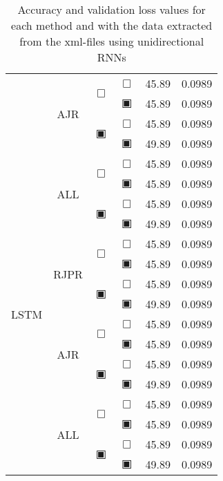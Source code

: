 \begin{table}[H]
\begin{tabular}{|c|c|c|c|c|c|}
				    & \multirow{4}{*}{ AJR } & \multirow{2}{*}{$\Box$} & $\Box$ & 45.89 & 0.0989\\\cline{4-6}
				    &                     &                         & $\blackinwhitesquare$ & 45.89 & 0.0989\\\cline{3-6}
				    &                     & \multirow{2}{*}{$\blackinwhitesquare$} & $\Box$ & 45.89 & 0.0989\\\cline{4-6}
				    &                     &                         & $\blackinwhitesquare$ & 49.89 & 0.0989\\\cline{2-6}
				    & \multirow{4}{*}{ ALL } & \multirow{2}{*}{$\Box$} & $\Box$ & 45.89 & 0.0989\\\cline{4-6}
				    &                     &                         & $\blackinwhitesquare$ & 45.89 & 0.0989\\\cline{3-6}
				    &                     & \multirow{2}{*}{$\blackinwhitesquare$} & $\Box$ & 45.89 & 0.0989\\\cline{4-6}
				    &                     &                         & $\blackinwhitesquare$ & 49.89 & 0.0989\\\cline{2-6}
		\hline\hline
		\multirow{8}{*}{LSTM}& \multirow{4}{*}{ RJPR } & \multirow{2}{*}{$\Box$} & $\Box$ & 45.89 & 0.0989\\\cline{4-6}
				    &                    &                         & $\blackinwhitesquare$ & 45.89 & 0.0989\\\cline{3-6}
				    &                    & \multirow{2}{*}{$\blackinwhitesquare$} & $\Box$ & 45.89 & 0.0989\\\cline{4-6}
				    &                    &                         & $\blackinwhitesquare$ & 49.89 & 0.0989\\\cline{2-6}
				    & \multirow{4}{*}{ AJR } & \multirow{2}{*}{$\Box$} & $\Box$ & 45.89 & 0.0989\\\cline{4-6}
				    &                     &                         & $\blackinwhitesquare$ & 45.89 & 0.0989\\\cline{3-6}
				    &                     & \multirow{2}{*}{$\blackinwhitesquare$} & $\Box$ & 45.89 & 0.0989\\\cline{4-6}
				    &                     &                         & $\blackinwhitesquare$ & 49.89 & 0.0989\\\cline{2-6}
				    & \multirow{4}{*}{ ALL } & \multirow{2}{*}{$\Box$} & $\Box$ & 45.89 & 0.0989\\\cline{4-6}
				    &                     &                         & $\blackinwhitesquare$ & 45.89 & 0.0989\\\cline{3-6}
				    &                     & \multirow{2}{*}{$\blackinwhitesquare$} & $\Box$ & 45.89 & 0.0989\\\cline{4-6}
				    &                     &                         & $\blackinwhitesquare$ & 49.89 & 0.0989\\\cline{2-6}
		\hline\hline
	\end{tabular}
	\caption{Accuracy and validation loss values for each method and with the data extracted from the xml-files using unidirectional RNNs}
	\label{tab:results-experiments-rnn}
\end{table}
